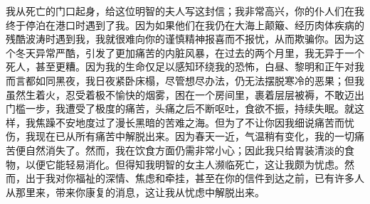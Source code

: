 
我从死亡的门口起身，给这位明智的夫人写这封信；我非常高兴，你的仆人们在我终于停泊在港口时遇到了我。因为如果他们在我仍在大海上颠簸、经历肉体疾病的残酷波涛时遇到我，我就很难向你的谨慎精神报喜而不报忧，从而欺骗你。因为这个冬天异常严酷，引发了更加痛苦的内脏风暴，在过去的两个月里，我无异于一个死人，甚至更糟。因为我的生命仅足以感知环绕我的恐怖，白昼、黎明和正午对我而言都如同黑夜，我日夜紧卧床榻，尽管想尽办法，仍无法摆脱寒冷的恶果；但我虽然生着火，忍受着极不愉快的烟雾，困在一个房间里，裹着层层被褥，不敢迈出门槛一步，我遭受了极度的痛苦，头痛之后不断呕吐，食欲不振，持续失眠。就这样，我焦躁不安地度过了漫长黑暗的苦难之海。但为了不让你因我细说痛苦而忧伤，我现在已从所有痛苦中解脱出来。因为春天一近，气温稍有变化，我的一切痛苦便自然消失了。然而，我在饮食方面仍需非常小心；因此我只给胃装清淡的食物，以便它能轻易消化。但得知我明智的女主人濒临死亡，这让我颇为忧虑。然而，出于我对你福祉的深情、焦虑和牵挂，甚至在你的信件到达之前，已有许多人从那里来，带来你康复的消息，这让我从忧虑中解脱出来。\par

